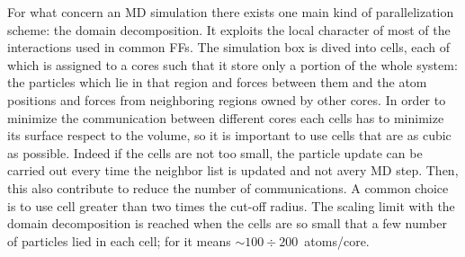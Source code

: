 For what concern an \ac{MD} simulation there exists one main kind of parallelization scheme: the domain decomposition. It exploits the local character of most of the interactions used in common \acp{FF}. The simulation box is dived into cells, each of which is assigned to a cores such that it store only a portion of the whole system: the particles which lie in that region and forces between them and the atom positions and forces from neighboring regions owned by other cores. In order to minimize the communication between different cores each cells has to minimize its surface respect to the volume, so it is important to use cells that are as cubic as possible. Indeed if the cells are not too small, the particle update can be carried out every time the neighbor list is updated and not avery \ac{MD} step. Then, this also contribute to reduce the number of communications. A common choice is to use cell greater than two times the cut-off radius. The scaling limit with the domain decomposition is reached when the cells are so small that a few number of particles lied in each cell; for \gromacs it means $\sim 100 \div 200$~atoms/core.

